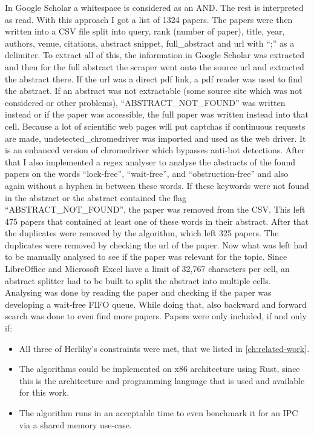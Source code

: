In Google Scholar a whitespace is considered as an AND. The rest is interpreted as read. With this approach I got a list of 1324 papers. The papers were then written into a CSV file split into query, rank (number of paper), title, year, authors, venue, citations, abstract snippet, full\_abstract and url with \enquote{;} as a delimiter. To extract all of this, the information in Google Scholar was extracted and then for the full abstract the scraper went onto the source url and extracted the abstract there. If the url was a direct pdf link, a pdf reader was used to find the abstract. If an abstract was not extractable (some source site which was not considered or other problems), \enquote{ABSTRACT\_NOT\_FOUND} was written instead or if the paper was accessible, the full paper was written instead into that cell. Because a lot of scientific web pages will put captchas if continuous requests are made, undetected\_chromedriver was imported and used as the web driver. It is an enhanced version of chromedriver which bypasses anti-bot detections. After that I also implemented a regex analyser to analyse the abstracts of the found papers on the words \enquote{lock-free}, \enquote{wait-free}, and \enquote{obstruction-free} and also again without a hyphen in between these words. If these keywords were not found in the abstract or the abstract contained the flag \enquote{ABSTRACT\_NOT\_FOUND}, the paper was removed from the CSV. This left 475 papers that contained at least one of these words in their abstract. After that the duplicates were removed by the algorithm, which left 325 papers. The duplicates were removed by checking the url of the paper. Now what was left had to be manually analysed to see if the paper was relevant for the topic. Since LibreOffice and Microsoft Excel have a limit of 32,767 characters per cell, an abstract splitter had to be built to split the abstract into multiple cells. Analysing was done by reading the paper and checking if the paper was developing a wait-free \ac{FIFO} queue. While doing that, also backward and forward search was done to even find more papers. Papers were only included, if and only if: 
\begin{itemize}
   \item All three of Herlihy's constraints were met, that we listed in \cref{ch:related-work}.
   \item The algorithms could be implemented on x86 architecture using Rust, since this is the architecture and programming language that is used and available for this work.
   \item The algorithm runs in an acceptable time to even benchmark it for an \ac{IPC} via a shared memory use-case.
\end{itemize}
